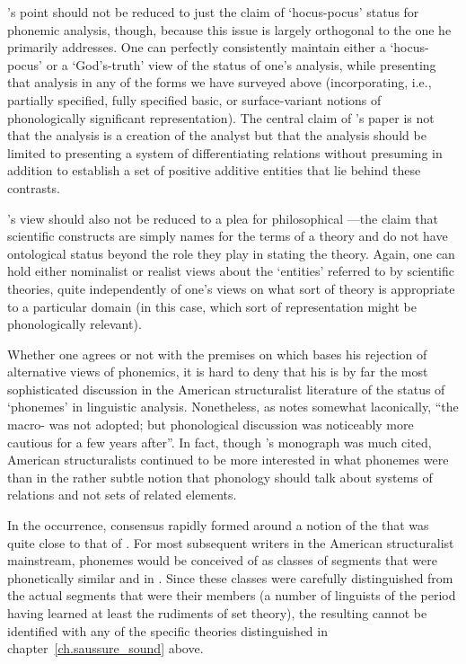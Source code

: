 {\Twaddell}'s point should not be reduced to just the claim of
`hocus-pocus' status for phonemic analysis, though, because this issue
is largely orthogonal to the one he primarily addresses. One can
perfectly consistently maintain either a `hocus-pocus' or a
`God's-truth' view of the status of one's analysis, while presenting
that analysis in any of the forms we have surveyed above
(incorporating, i.e., partially specified, fully specified basic, or
surface-variant notions of phonologically significant
representation). The central claim of {\Twaddell}'s paper is not that the
analysis is a creation of the analyst but that the analysis should be
limited to presenting a system of differentiating relations without
presuming in addition to establish a set of positive additive entities
that lie behind these contrasts.

{\Twaddell}'s view should also not be reduced to a plea for philosophical
—the claim that scientific constructs are simply names for
the terms of a theory and do not have ontological status beyond the
role they play in stating the theory. Again, one can hold either
nominalist or realist views about the `entities' referred to by
scientific theories, quite independently of one's views on what sort
of theory is appropriate to a particular domain (in this case, which
sort of representation might be phonologically relevant).

Whether one agrees or not with the premises on which {\Twaddell} bases
his rejection of alternative views of phonemics, it is hard to deny
that his is by far the most sophisticated discussion in the American
structuralist literature of the status of `phonemes' in linguistic
analysis. Nonetheless, as \citet[80]{joos57:readings} notes somewhat
laconically, ``the macro- was not adopted; but phonological
discussion was noticeably more cautious for a few years after''. In
fact, though {\Twaddell}'s monograph was much cited, American
structuralists continued to be more interested in what phonemes were
than in the rather subtle notion that phonology should talk about
systems of relations and not sets of related elements.

In the occurrence, consensus rapidly formed around a notion of the
 that was quite close to that of {\Jones}. For most subsequent
writers in the American structuralist mainstream, phonemes would be
conceived of as classes of segments that were phonetically similar and
in . Since these classes were carefully
distinguished from the actual segments that were their members (a
number of linguists of the period having learned at least the
rudiments of set theory), the resulting  cannot be
identified with any of the specific theories distinguished in
chapter~\ref{ch.saussure_sound} above.


